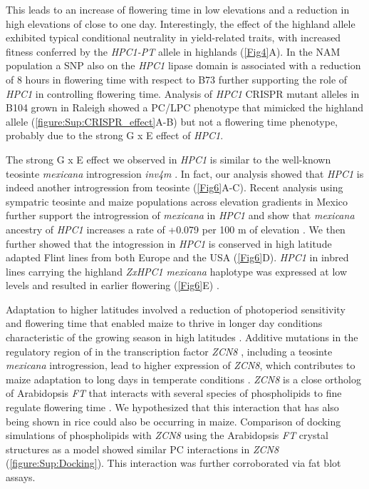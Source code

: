 \documentclass[9pt,twocolumn,twoside,lineno]{biorxiv}
\newcommand{\mex}{\textit{mexicana}\xspace}
\newcommand{\hpc}{\textit{HPC1}\xspace}
\begin{document}
This leads to an increase of flowering time in low elevations and a reduction in high elevations of close to one day. 
Interestingly, the effect of the highland allele exhibited typical conditional neutrality in yield-related traits, with increased fitness conferred by the \textit{HPC1-PT} allele in highlands (\cref{Fig4}A). 
In the NAM population a SNP also on the \hpc lipase domain is associated with a reduction of 8 hours in flowering time with respect to B73 \cite{Wallace2014-yy} further supporting the role of \hpc in controlling flowering time. 
Analysis of \hpc CRISPR mutant alleles in B104 grown in Raleigh showed a PC/LPC phenotype that mimicked the highland allele (\cref{figure:Sup:CRISPR_effect}A-B) but not a flowering time phenotype, probably due to the strong G x E effect of \hpc. 

The strong G x E effect we observed in \hpc is similar to the well-known teosinte \mex introgression \textit{inv4m} \cite{Crow2020-gene}. 
In fact, our analysis showed that \hpc is indeed another introgression from teosinte  (\cref{Fig6}A-C). 
Recent analysis using sympatric teosinte and maize populations across elevation gradients in Mexico further support the introgression of \mex in \hpc and show that \mex ancestry of \hpc increases a rate of +0.079 per 100 m of elevation \cite{Calfee2021-mr}.
We then further showed that the  intogression in \hpc is conserved in high latitude adapted Flint lines from both Europe and the USA (\cref{Fig6}D).
\textit{HPC1} in inbred lines carrying the highland \textit{ZxHPC1} \mex haplotype was expressed at low levels and resulted in earlier flowering (\cref{Fig6}E) \cite{Kremling2018-gn}.  

Adaptation to higher latitudes involved a reduction of photoperiod sensitivity and flowering time that enabled maize to thrive in longer day conditions characteristic of the growing season in high latitudes \cite{Hung2012-ms, Swarts2017-ge, Yang2013-lg, Huang2018-ga}.
Additive mutations in the regulatory region of in the transcription factor \textit{ZCN8} \cite{Lazakis2011-nq}, including a teosinte \mex introgression, lead to higher expression of \textit{ZCN8}, which contributes to maize adaptation to long days in temperate conditions \cite{Guo2019-pn}.
\textit{ZCN8} is a close ortholog of Arabidopsis \textit{FT} that interacts with several species of phospholipids to fine regulate flowering time \cite{Nakamura2014-qf, Susila2021-dz}.  
We hypothesized that this interaction that has also being shown in rice \cite{Qu2021-wc} could also be occurring in maize. 
Comparison of docking simulations of phospholipids with \textit{ZCN8} using the Arabidopsis \textit{FT} crystal structures as a model \cite{Nakamura2019-ht} showed similar PC interactions in \textit{ZCN8} (\cref{figure:Sup:Docking}).
This interaction was further corroborated via fat blot assays. %
\end{document}
